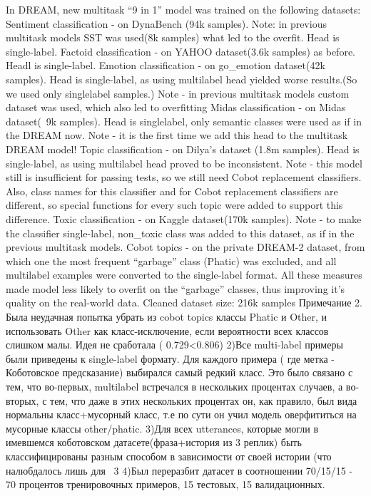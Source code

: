 In DREAM, new multitask “9 in 1” model was trained on the following datasets:
Sentiment classification - on DynaBench (94k samples). Note: in previous multitask models SST was used(8k samples) what led to the overfit. Head is single-label.
Factoid classification - on YAHOO dataset(3.6k samples) as before. Headl is single-label.
Emotion classification - on go_emotion dataset(42k samples). Head is single-label, as using multilabel head yielded worse results.(So we used only singlelabel samples.) Note - in previous multitask models custom dataset was used, which also led to overfitting
Midas classification - on Midas dataset(~9k samples). Head is singlelabel, only semantic classes were used as if in the DREAM now. Note - it is the first time we add this head to the multitask DREAM model!
Topic classification - on Dilya’s dataset (1.8m samples). Head is single-label, as using multilabel head proved to be inconsistent. Note - this model still is insufficient for passing tests, so we still need Cobot replacement classifiers. Also, class names for this classifier and for Cobot replacement classifiers are different, so special functions for every such topic were added to support this difference.
Toxic classification - on Kaggle dataset(170k samples). Note - to make the classifier single-label, non_toxic class was added to this dataset, as if in the previous multitask models.
Cobot topics - on the private DREAM-2 dataset, from which one the most frequent “garbage” class (Phatic) was excluded, and all multilabel examples were converted to the single-label format. All these measures made model less likely to overfit on the “garbage” classes, thus improving it’s quality on the real-world data. Cleaned dataset size: 216k samples
Примечание 2. Была неудачная попытка убрать из cobot topics классы Phatic и Other, и использовать Other как класс-исключение, если вероятности всех классов слишком малы. Идея не сработала ( 0.729<0.806)
2)Все multi-label примеры были приведены к single-label формату. Для каждого примера ( где метка - Коботовское предсказание) выбирался самый редкий класс. Это было связано с тем, что во-первых, multilabel встречался в нескольких процентах случаев, а во-вторых, с тем, что даже в этих нескольких процентах он, как правило, был вида нормальны класс+мусорный класс, т.е по сути он учил модель оверфититься на мусорные классы other/phatic.
3)Для всех utterances, которые могли в имевшемся коботовском датасете(фраза+история из 3 реплик) быть классифицированы разным способом в зависимости от своей истории (что налюбдалось лишь для ~3%
4)Был переразбит датасет в соотношении 70/15/15 - 70 процентов тренировочных примеров, 15 тестовых, 15 валидационных.

